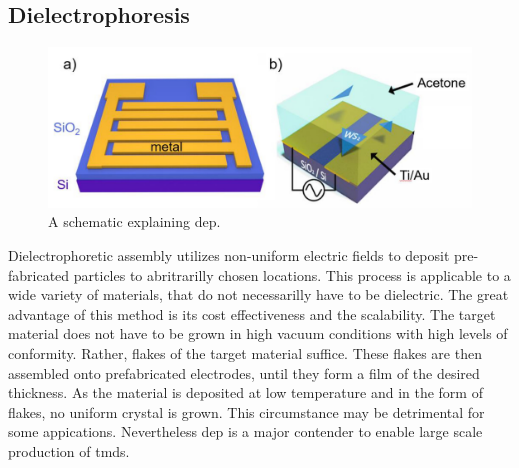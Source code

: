 \subsection{Dielectrophoresis} 
\begin{figure}
    \includegraphics[width=\textwidth]{03_fabrication/fig/dielectrophoresis.jpg}
    \caption{A schematic explaining \gls{dep}. \cite{Deng2019}}
    \label{fig:fabrication_dep}
\end{figure}
Dielectrophoretic assembly utilizes non-uniform electric fields to deposit pre-fabricated particles to abritrarilly chosen locations. This process is applicable to a wide variety of materials, that do not necessarilly have to be dielectric. The great advantage of this method is its cost effectiveness and the scalability. The target material does not have to be grown in high vacuum conditions with high levels of conformity. Rather, flakes of the target material suffice. These flakes are then assembled onto prefabricated electrodes, until they form a film of the desired thickness. As the material is deposited at low temperature and in the form of flakes, no uniform crystal is grown. This circumstance may be detrimental for some appications. Nevertheless \gls{dep} is a major contender to enable large scale production of \glspl{tmd}.  
